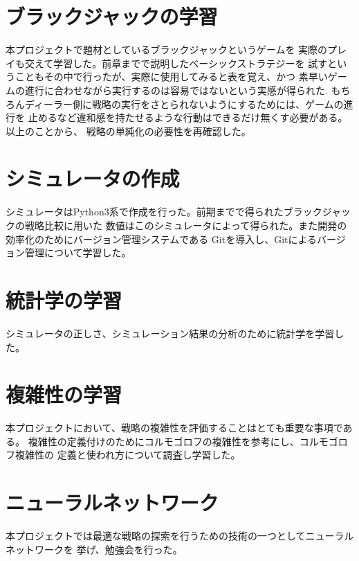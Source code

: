 \section{ブラックジャックの学習}
本プロジェクトで題材としているブラックジャックというゲームを
実際のプレイも交えて学習した。前章までで説明したベーシックストラテジーを
試すということもその中で行ったが、実際に使用してみると表を覚え、かつ
素早いゲームの進行に合わせながら実行するのは容易ではないという実感が得られた.
もちろんディーラー側に戦略の実行をさとられないようにするためには、ゲームの進行を
止めるなど違和感を持たせるような行動はできるだけ無くす必要がある。以上のことから、
戦略の単純化の必要性を再確認した。

\section{シミュレータの作成}
シミュレータはPython3系で作成を行った。前期までで得られたブラックジャックの戦略比較に用いた
数値はこのシミュレータによって得られた。また開発の効率化のためにバージョン管理システムである
Gitを導入し、Gitによるバージョン管理について学習した。


\section{統計学の学習}
シミュレータの正しさ、シミュレーション結果の分析のために統計学を学習した。

\section{複雑性の学習}
本プロジェクトにおいて、戦略の複雑性を評価することはとても重要な事項である。
複雑性の定義付けのためにコルモゴロフの複雑性を参考にし、コルモゴロフ複雑性の
定義と使われ方について調査し学習した。

\section{ニューラルネットワーク}
本プロジェクトでは最適な戦略の探索を行うための技術の一つとしてニューラルネットワークを
挙げ、勉強会を行った。
